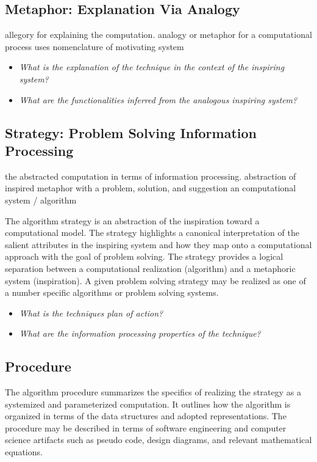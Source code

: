 \documentclass[a4paper, 11pt]{article}
\begin{document}
\subsection{Metaphor: Explanation Via Analogy}
allegory for explaining the computation. analogy or metaphor for a computational process
uses nomenclature of motivating system

\begin{itemize}
	\item \emph{What is the explanation of the technique in the context of the inspiring system?}
	\item \emph{What are the functionalities inferred from the analogous inspiring system?}
\end{itemize}

\subsection{Strategy: Problem Solving Information Processing}
the abstracted computation in terms of information processing. abstraction of inspired metaphor with a problem, solution, and suggestion an computational system / algorithm

The algorithm strategy is an abstraction of the inspiration toward a computational model. The strategy highlights a canonical interpretation of the salient attributes in the inspiring system and how they map onto a computational approach with the goal of problem solving. The strategy provides a logical separation between a computational realization (algorithm) and a metaphoric system (inspiration). A given problem solving strategy may be realized as one of a number specific algorithms or problem solving systems.

\begin{itemize}
	\item \emph{What is the techniques plan of action?}
	\item \emph{What are the information processing properties of the technique?}
\end{itemize}

\subsection{Procedure}
The algorithm procedure summarizes the specifics of realizing the strategy as a systemized and parameterized computation. It outlines how the algorithm is organized in terms of the data structures and adopted representations. The procedure may be described in terms of software engineering and computer science artifacts such as pseudo code, design diagrams, and relevant mathematical equations.
\end{document}
